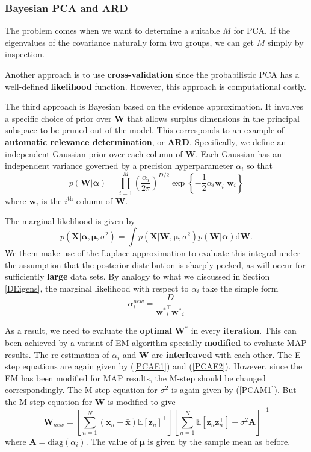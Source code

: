 \documentclass[a4paper]{book}
\newcommand{\ud}{\mathrm{d}}
\newcommand{\up}{\mathrm}
\renewcommand{\bf}{\mathbf}
\newcommand{\bb}{\mathbb}
\newcommand{\bs}{\boldsymbol}
\begin{document}
\subsubsection{Bayesian PCA and ARD}
The problem comes when we want to determine a suitable $M$ for PCA. If the eigenvalues of the covariance naturally form two groups, we can get $M$ simply by inspection. 

Another approach is to use \textbf{cross-validation} since the probabilistic PCA has a well-defined \textbf{likelihood} function. However, this approach is computational costly.

The third approach is Bayesian based on the evidence approximation. It involves a specific choice of prior over $\bf{W}$ that allows surplus dimensions in the principal subspace to be pruned out of the model. This corresponds to an example of \textbf{automatic relevance determination}, or \textbf{ARD}. Specifically, we define an independent Gaussian prior over each column of $\bf{W}$. Each Gaussian has an independent variance governed by a precision hyperparameter $\alpha_i$ so that
\begin{equation}
	p(\bf{W}|\bs{\alpha}) = \prod_{i=1}^M \left( \frac{\alpha_i}{2\pi} \right)^{D/2} \exp\left\{ -\frac{1}{2}\alpha_i \bf{w}_i^{\intercal} \bf{w}_i \right\}
\end{equation}
where $\bf{w}_i$ is the $i^{\up{th}}$ column of $\bf{W}$.

The marginal likelihood is given by
\begin{equation}
	p(\bf{X}|\bs{\alpha,\mu},\sigma^2) = \int p(\bf{X|W},\bs{\mu},\sigma^2) p(\bf{W}|\bs{\alpha}) \ud \bf{W}.
\end{equation}
We them make use of the Laplace approximation to evaluate this integral under the assumption that the posterior distribution is sharply peeked, as will occur for sufficiently \textbf{large} data sets. By analogy to what we discussed in Section \ref{DEigens}, the marginal likelihood with respect to $\alpha_i$ take the simple form
\begin{equation}
	\alpha_i^{new} = \frac{D}{\bf{w^*}_i^{\intercal} \bf{w^*}_i}
\end{equation}

As a result, we need to evaluate the \textbf{optimal} $\bf{W}^*$ in every \textbf{iteration}. This can been achieved by a variant of EM algorithm specially \textbf{modified} to evaluate MAP results. The re-estimation of $\alpha_i$ and $\bf{W}$ are \textbf{interleaved} with each other. The E-step equations are again given by (\ref{PCAE1}) and (\ref{PCAE2}). However, since the EM has been modified for MAP results, the M-step should be changed correspondingly. The M-step equation for $\sigma^2$ is again given by (\ref{PCAM1}). But the M-step equation for $\bf{W}$ is modified to give
\begin{equation}
	\bf{W}_{new} = \left[ \sum_{n=1}^N (\bf{x}_n-\bar{\bf{x}})\bb{E}[\bf{z}_n]^{\intercal} \right] \left[ \sum_{n=1}^N \bb{E}[\bf{z}_n\bf{z}_n^{\intercal}] +\sigma^2 \bf{A}\right]^{-1}
\end{equation}
where $\bf{A} = \up{diag}(\alpha_i)$. The value of $\bs{\mu}$ is given by the sample mean as before.
\end{document}
